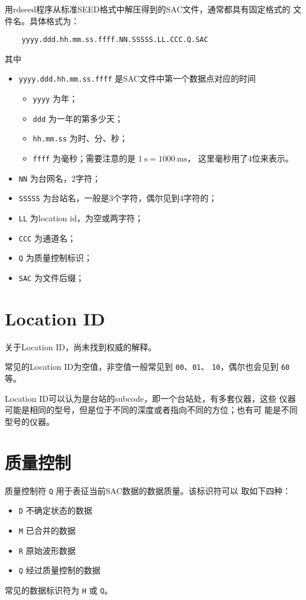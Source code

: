 用rdseed程序从标准SEED格式中解压得到的SAC文件，通常都具有固定格式的
文件名。具体格式为：
\begin{verbatim}
    yyyy.ddd.hh.mm.ss.ffff.NN.SSSSS.LL.CCC.Q.SAC
\end{verbatim}
其中
\begin{itemize}
\item \texttt{yyyy.ddd.hh.mm.ss.ffff} 是SAC文件中第一个数据点对应的时间
    \begin{itemize}
    \item \texttt{yyyy} 为年；
    \item \texttt{ddd} 为一年的第多少天；
    \item \texttt{hh.mm.ss} 为时、分、秒；
    \item \texttt{ffff} 为毫秒；需要注意的是 $\SI{1}{\s}=\SI{1000}{\ms}$，
        这里毫秒用了4位来表示。
    \end{itemize}
\item \texttt{NN} 为台网名，2字符；
\item \texttt{SSSSS} 为台站名，一般是3个字符，偶尔见到4字符的；
\item \texttt{LL} 为location id，为空或两字符；
\item \texttt{CCC} 为通道名；
\item \texttt{Q} 为质量控制标识；
\item \texttt{SAC} 为文件后缀；
\end{itemize}

\section{Location ID}
关于Location ID，尚未找到权威的解释。

常见的Location ID为空值，非空值一般常见到 \texttt{00}、\texttt{01}、
\texttt{10}，偶尔也会见到 \texttt{60} 等。

Location ID可以认为是台站的subcode，即一个台站处，有多套仪器，这些
仪器可能是相同的型号，但是位于不同的深度或者指向不同的方位；也有可
能是不同型号的仪器。

\section{质量控制}
质量控制符 \texttt{Q} 用于表征当前SAC数据的数据质量。该标识符可以
取如下四种：
\begin{itemize}
\item \texttt{D} 不确定状态的数据
\item \texttt{M} 已合并的数据
\item \texttt{R} 原始波形数据
\item \texttt{Q} 经过质量控制的数据
\end{itemize}
常见的数据标识符为 \texttt{H} 或 \texttt{Q}。

